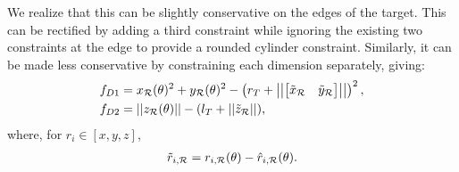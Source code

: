 We realize that this can be slightly conservative on the edges of the target.
This can be rectified by adding a third constraint while ignoring the existing two constraints at the edge to provide a rounded cylinder constraint.
Similarly, it can be made less conservative by constraining each dimension separately, giving:
\begin{subequations}
\begin{align}
    f_{D1}&=x_{\mathcal{R}}(\theta)^2 + y_{\mathcal{R}}(\theta)^2 - \left(r_T+\left|\left|\begin{bmatrix}
        \Tilde{x}_{\mathcal{R}}&\Tilde{y}_{\mathcal{R}}
    \end{bmatrix}\right|\right|\right)^2,\\
    f_{D2}&=||z_{\mathcal{R}}(\theta)|| - (l_T+||\Tilde{z}_{\mathcal{R}}||),
\end{align}
\end{subequations}
where, for $r_i\in[x,y,z]$,
\begin{align}
    \Tilde{r}_{i, {\mathcal{R}}}=r_{i, {\mathcal{R}}}(\theta)-\hat{r}_{i, {\mathcal{R}}}(\theta).
\end{align}
